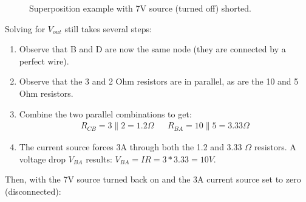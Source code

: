 \begin{figure}[H]
\begin{center}
\caption{Superposition example with 7V source (turned off) shorted.}
\end{center}
\end{figure}

Solving for $V_{out}$ still takes several steps:

\begin{enumerate}
\item Observe that B and D are now the same node (they are connected by a perfect wire).
\item Observe that the 3 and 2 Ohm resistors are in parallel, as are the 10 and 5 Ohm resistors.
\item Combine the two parallel combinations to get:
\begin{align*}
R_{CB}=3\parallel 2=1.2 \Omega && R_{BA}=10\parallel 5=3.33 \Omega
\end{align*}

\item The current source forces 3A through both the 1.2 and 3.33 $\Omega$ resistors. A voltage drop $V_{BA}$ results: $V_{BA}=IR=3*3.33 = 10V$.
\end{enumerate}

Then, with the 7V source turned back on and the 3A current source set to zero (disconnected):

